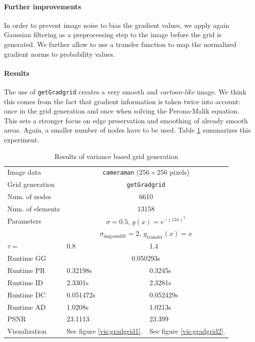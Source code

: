 \documentclass{report}
\begin{document}
\paragraph{Further improvements}

In order to prevent image noise to bias the gradient values, we apply again Gaussian filtering as a preprocessing step to the image before the grid is generated. We further allow to use a transfer function to map the normalized gradient norms to probability values.

\paragraph{Results}

The use of \texttt{getGradgrid} creates a very smooth and \emph{cartoon-like} image. We think this comes from the fact that gradient information is taken twice into account: once in the grid generation and once when solving the Perona-Malik equation. This sets a stronger focus on edge preservation and smoothing of already smooth areas. Again, a smaller number of nodes have to be used. Table \ref{res:gradgrid} summarizes this experiment.

\begin{table}[h]
	\centering
	\begin{tabular}{|lll}
		Image data & \multicolumn{2}{c}{\texttt{cameraman} ($256 \times 256$ pixels)} \\
		Grid generation & \multicolumn{2}{c}{\texttt{getGradgrid}} \\
		Num. of nodes & \multicolumn{2}{c}{6610} \\
		Num. of elements & \multicolumn{2}{c}{13158} \\
		Parameters & \multicolumn{2}{c}{$\sigma=0.5$, $g(x) = e^{-(12 x)^2}$} \\
		& \multicolumn{2}{c}{$\sigma_\text{imgaussfilt}=2$, $g_\text{transfer}(x) = x$}\\
		$\tau=$ & 0.8 & 1.4 \\
		Runtime GG & \multicolumn{2}{c}{0.050293s} \\
		Runtime PR & 0.32198s & 0.3245s \\
		Runtime ID & 2.3301s & 2.3281s\\
		Runtime DC & 0.051472s & 0.052429s \\
		Runtime AD & 1.0208s & 1.0213s \\
		PSNR & 23.1113 & 23.399 \\
		Visualization & See figure \ref{vis:gradgrid1}. & See figure \ref{vis:gradgrid2}. \\
	\end{tabular}
	\caption{Results of variance based grid generation}
	\label{res:gradgrid}
\end{table}
\end{document}
